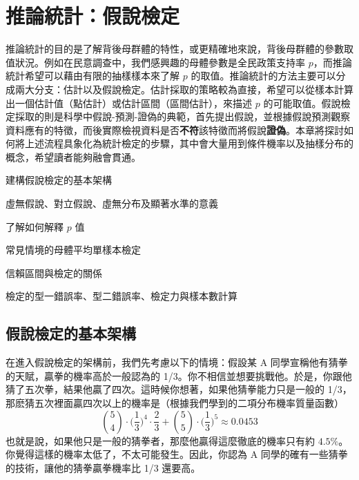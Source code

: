 \chapter{推論統計：假說檢定}

    推論統計的目的是了解背後母群體的特性，或更精確地來說，背後母群體的參數取值狀況。例如在民意調查中，我們感興趣的母體參數是全民政策支持率 $p$，而推論統計希望可以藉由有限的抽樣樣本來了解 $p$ 的取值。推論統計的方法主要可以分成兩大分支：估計以及假說檢定。估計採取的策略較為直接，希望可以從樣本計算出一個估計值（點估計）或估計區間（區間估計），來描述 $p$ 的可能取值。假說檢定採取的則是科學中假說-預測-證偽的典範，首先提出假說，並根據假說預測觀察資料應有的特徵，而後實際檢視資料是否\textbf{不符}該特徵而將假說\textbf{證偽}。本章將探討如何將上述流程具象化為統計檢定的步驟，其中會大量用到條件機率以及抽樣分布的概念，希望讀者能夠融會貫通。
    
    \begin{introduction}
        \item 建構假說檢定的基本架構
        \item 虛無假說、對立假說、虛無分布及顯著水準的意義
        \item 了解如何解釋 $p$ 值
        \item 常見情境的母體平均單樣本檢定
        \item 信賴區間與檢定的關係
        \item 檢定的型一錯誤率、型二錯誤率、檢定力與樣本數計算
    \end{introduction}

\section{假說檢定的基本架構}

    在進入假說檢定的架構前，我們先考慮以下的情境：假設某 A 同學宣稱他有猜拳的天賦，贏拳的機率高於一般認為的 1/3。你不相信並想要挑戰他。於是，你跟他猜了五次拳，結果他贏了四次。這時候你想著，如果他猜拳能力只是一般的 1/3，那麽猜五次裡面贏四次以上的機率是（根據我們學到的二項分布機率質量函數）
    \[\binom{5}{4} \cdot \Big(\frac{1}{3}\Big)^4 \cdot \frac{2}{3} + \binom{5}{5} \cdot \Big(\frac{1}{3}\Big)^5 \approx 0.0453\]
    也就是說，如果他只是一般的猜拳者，那麼他贏得這麼徹底的機率只有約 $4.5 \%$。你覺得這樣的機率太低了，不太可能發生。因此，你認為 A 同學的確有一些猜拳的技術，讓他的猜拳贏拳機率比 1/3 還要高。

